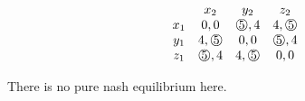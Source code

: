 \begin{enumerate}
\begin{latin}
\begin{center}
\begin{equation*}
            \begin{matrix}
                & x_2 & y_2 & z_2 \\
                x_1 & 0,0 & \circs{5},4 & 4,\circs{5} \\
                y_1 & 4,\circs{5} & 0,0 & \circs{5},4 \\
                z_1 & \circs{5},4 & 4,\circs{5} & 0,0 
                \end{matrix}
            \end{equation*}
       \end{center}
       There is no pure nash equilibrium here.
    \end{latin}
\end{enumerate}





